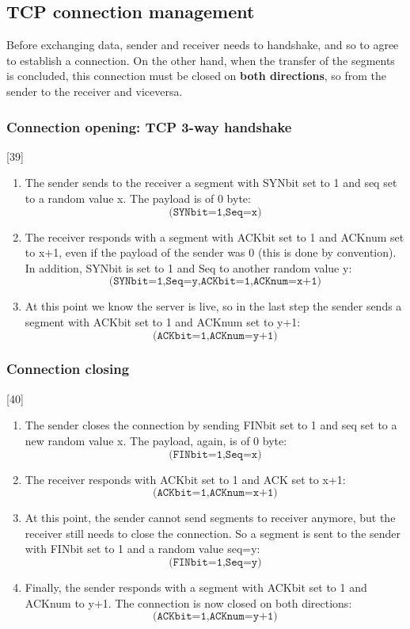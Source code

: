 \subsection{TCP connection management}  
Before exchanging data, sender and receiver needs to handshake, and so to agree to establish a connection. On the other hand, when the transfer of the segments is concluded, this connection must be closed on \textbf{both directions}, so from the sender to the receiver and viceversa.
\subsubsection{Connection opening: TCP 3-way handshake}
[39]
\begin{enumerate}
    \item The sender sends to the receiver a segment with SYNbit set to 1 and seq set to a random value x. The payload is of 0 byte:
    \[\texttt{(SYNbit=1,Seq=x)}\]
    \item The receiver responds with a segment with ACKbit set to 1 and ACKnum set to x+1, even if the payload of the sender was 0 (this is done by convention). In addition, SYNbit is set to 1 and Seq to another random value y:
    \[\texttt{(SYNbit=1,Seq=y,ACKbit=1,ACKnum=x+1)}\]
    \item At this point we know the server is live, so in the last step the sender sends a segment with ACKbit set to 1 and ACKnum set to y+1:
    \[\texttt{(ACKbit=1,ACKnum=y+1)}\]
\end{enumerate}

\subsubsection{Connection closing}
[40]
\begin{enumerate}
    \item The sender closes the connection by sending FINbit set to 1 and seq set to a new random value x. The payload, again, is of 0 byte:
    \[\texttt{(FINbit=1,Seq=x)}\]
    \item The receiver responds with ACKbit set to 1 and ACK set to x+1:
    \[\texttt{(ACKbit=1,ACKnum=x+1)}\]
    \item At this point, the sender cannot send segments to receiver anymore, but the receiver still needs to close the connection. So a segment is sent to the sender with FINbit set to 1 and a random value seq=y:
    \[\texttt{(FINbit=1,Seq=y)}\]
    \item Finally, the sender responds with a segment with ACKbit set to 1 and ACKnum to y+1. The connection is now closed on both directions:
    \[\texttt{(ACKbit=1,ACKnum=y+1)}\]
\end{enumerate}

